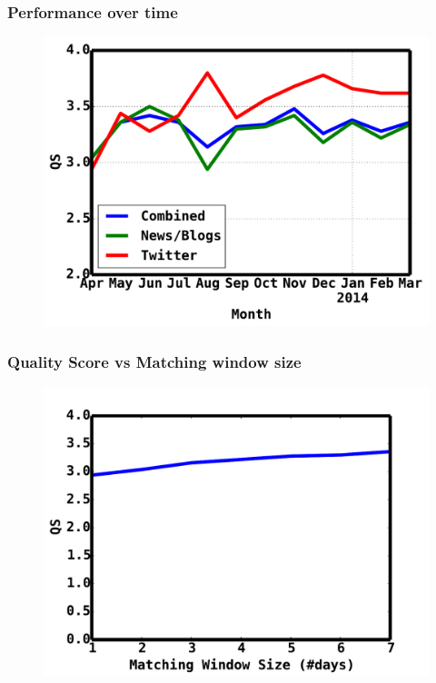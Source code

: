 \documentclass[red]{beamer}
\begin{document}
\begin{frame}
    \frametitle{Performance over time}
    \begin{figure}
        \includegraphics[scale=0.4]{monthlyqs}
    \end{figure}
\end{frame}

\begin{frame}
    \frametitle{Quality Score vs Matching window size}
    \begin{figure}
        \includegraphics[scale=0.4]{matchingwindow}
    \end{figure}
\end{frame}
\end{document}
